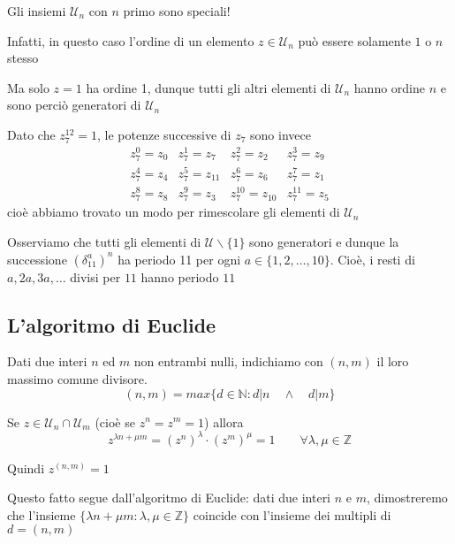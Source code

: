 \documentclass[11pt]{article}
\newcommand{\calU}{\mathcal{U}}
\begin{document}
    Gli insiemi $\calU_n$ con $n$ primo sono speciali!

    Infatti, in questo caso l'ordine di un elemento $z \in \calU_n$ può essere solamente $1$ o $n$ stesso

    Ma solo $z = 1$ ha ordine 1, dunque tutti gli altri elementi di $\calU_n$ hanno ordine $n$ e sono perciò generatori di $\calU_n$

    \begin{example}{}{}
        Dato che $z_7^{12} = 1$, le potenze successive di $z_7$ sono invece
        $$\begin{array}{llll}
            z_7^0 = z_0 & z_7^1 = z_7 & z_7^2 = z_2 & z_7^3 = z_9 \\
            z_7^4 = z_4 & z_7^5 = z_{11} & z_7^6 = z_6 & z_7^7 = z_1 \\
            z_7^8 = z_8 & z_7^9 = z_3 & z_7^{10} = z_{10} & z_7^{11} = z_5
        \end{array}$$
        cioè abbiamo trovato un modo per rimescolare gli elementi di $\calU_n$
    \end{example}

    Osserviamo che tutti gli elementi di $\calU \backslash \{1\}$ sono generatori e dunque la successione $(\delta_{11}^a)^n$ ha periodo 11 per ogni $a \in \{1, 2, \dots, 10\}$. Cioè, i resti di $a, 2a, 3a, \dots$ divisi per $11$ hanno periodo $11$
    
\subsection{L'algoritmo di Euclide}
    \begin{definition}{}{}
        Dati due interi $n$ ed $m$ non entrambi nulli, indichiamo con $(n, m)$ il loro massimo comune divisore.
        $$(n,m) = max\{d \in \mathbb{N}: d | n \quad \land \quad d|m\}$$
    \end{definition}

    Se $z \in \calU_n \cap \calU_m$ (cioè se $z^n = z^m = 1$) allora
    $$z^{\lambda n+\mu m} = (z^n)^\lambda \cdot (z^m)^\mu = 1 \qquad \forall \lambda, \mu \in \mathbb{Z}$$

    Quindi $z^{(n,m)}=1$

    Questo fatto segue dall'algoritmo di Euclide: dati due interi $n$ e $m$, dimostreremo che l'insieme $\{\lambda n + \mu m : \lambda, \mu \in \mathbb{Z}\}$ coincide con l'insieme dei multipli di $d = (n,m)$
\end{document}
